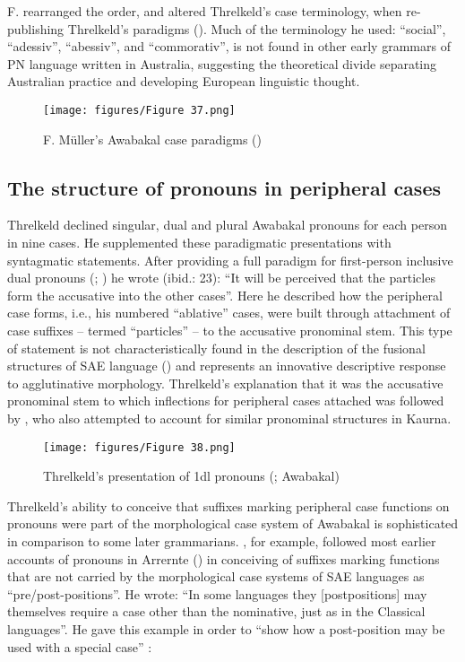 F. \citet[7--8]{muller_grundris_1882} rearranged the order, and altered Threlkeld’s case terminology, when re-publishing Threlkeld’s paradigms (). Much of the terminology he used: ``social'', ``adessiv'', ``abessiv'', and ``commorativ'', is not found in other early grammars of PN language written in Australia, suggesting the theoretical divide separating Australian practice and developing European linguistic thought.

\begin{figure}
\texttt{[image: figures/Figure 37.png]}
\caption{\label{fig:3:37} F. Müller’s Awabakal case paradigms (\citeyear[7]{muller_grundris_1882})}
\end{figure}


\subsection{The structure of pronouns in peripheral cases}
\label{sec:key:3.3.3.1}

Threlkeld declined singular, dual and plural Awabakal pronouns for each person in nine cases. He supplemented these paradigmatic presentations with syntagmatic statements. After providing a full paradigm for first-person inclusive dual pronouns (\citeyear[23]{threlkeld_australian_1834}; ) he wrote (ibid.: 23): “It will be perceived that the particles form the accusative into the other cases”. Here he described how the peripheral case forms, i.e., his numbered “ablative” cases, were built through attachment of case suffixes – termed “particles” – to the accusative pronominal stem. This type of statement is not characteristically found in the description of the fusional structures of SAE language () and represents an innovative descriptive response to agglutinative morphology. Threlkeld’s explanation that it was the accusative pronominal stem to which inflections for peripheral cases attached was followed by \citet[8]{teichelmann_outlines_1840}, who also attempted to account for similar pronominal structures in Kaurna.

\begin{figure}
\texttt{[image: figures/Figure 38.png]}
\caption{\label{fig:3:38} Threlkeld’s presentation of 1dl pronouns (\citeyear[23]{threlkeld_australian_1834}; Awabakal)}
\end{figure}


Threlkeld’s ability to conceive that suffixes marking peripheral case functions on pronouns were part of the morphological case system of Awabakal is sophisticated in comparison to some later grammarians. \citet[71]{capell_structure_1937}, for example, followed most earlier accounts of pronouns in Arrernte () in conceiving of suffixes marking functions that are not carried by the morphological case systems of SAE languages as ``pre/post-positions''. He wrote: “In some languages they [postpositions] may themselves require a case other than the nominative, just as in the Classical languages”. He gave this example in order to “show how a post-position may be used with a special case” \citep[71]{capell_structure_1937}:

